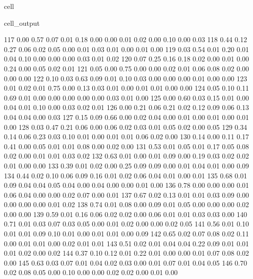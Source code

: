 \documentclass[letterpaper,10pt,english]{jupyterBook}
\begin{document}
\begin{sphinxuseclass}{cell}
\begin{sphinxVerbatimOutput}
\begin{sphinxuseclass}{cell_output}
\begin{sphinxVerbatim}[commandchars=\\\{\}]
       117	0.00 	0.57 	0.07 	0.01 	0.18 	0.00 	0.00 	0.01 	0.02 	0.00 	0.10 	0.00 	0.03
       118	0.44 	0.12 	0.27 	0.06 	0.02 	0.05 	0.00 	0.01 	0.03 	0.01 	0.00 	0.01 	0.00
       119	0.03 	0.54 	0.01 	0.20 	0.01 	0.04 	0.10 	0.00 	0.00 	0.00 	0.03 	0.01 	0.02
       120	0.07 	0.25 	0.16 	0.18 	0.02 	0.00 	0.01 	0.00 	0.24 	0.00 	0.05 	0.02 	0.01
       121	0.05 	0.00 	0.75 	0.00 	0.00 	0.02 	0.01 	0.06 	0.08 	0.02 	0.00 	0.00 	0.00
       122	0.10 	0.03 	0.63 	0.09 	0.01 	0.10 	0.03 	0.00 	0.00 	0.00 	0.01 	0.00 	0.00
       123	0.01 	0.02 	0.01 	0.75 	0.00 	0.13 	0.03 	0.01 	0.00 	0.01 	0.01 	0.00 	0.00
       124	0.05 	0.10 	0.11 	0.69 	0.01 	0.00 	0.00 	0.00 	0.00 	0.00 	0.03 	0.01 	0.00
       125	0.00 	0.60 	0.03 	0.15 	0.01 	0.00 	0.04 	0.01 	0.10 	0.00 	0.03 	0.02 	0.01
       126	0.00 	0.21 	0.06 	0.21 	0.02 	0.12 	0.09 	0.06 	0.13 	0.04 	0.04 	0.00 	0.03
       127	0.15 	0.09 	0.66 	0.00 	0.02 	0.04 	0.00 	0.01 	0.00 	0.01 	0.00 	0.01 	0.00
       128	0.03 	0.47 	0.21 	0.06 	0.00 	0.06 	0.02 	0.03 	0.01 	0.05 	0.02 	0.00 	0.05
       129	0.34 	0.14 	0.06 	0.23 	0.03 	0.10 	0.01 	0.00 	0.01 	0.01 	0.06 	0.02 	0.00
       130	0.14 	0.00 	0.11 	0.17 	0.41 	0.00 	0.05 	0.01 	0.01 	0.08 	0.00 	0.02 	0.00
       131	0.53 	0.01 	0.05 	0.01 	0.17 	0.05 	0.08 	0.02 	0.00 	0.01 	0.01 	0.03 	0.02
       132	0.63 	0.01 	0.00 	0.01 	0.09 	0.00 	0.19 	0.03 	0.02 	0.02 	0.01 	0.00 	0.00
       133	0.39 	0.01 	0.02 	0.00 	0.25 	0.09 	0.09 	0.00 	0.01 	0.04 	0.01 	0.00 	0.09
       134	0.44 	0.02 	0.10 	0.06 	0.09 	0.16 	0.01 	0.02 	0.06 	0.04 	0.01 	0.00 	0.01
       135	0.68 	0.01 	0.09 	0.04 	0.04 	0.05 	0.04 	0.00 	0.04 	0.00 	0.00 	0.01 	0.00
       136	0.78 	0.00 	0.00 	0.00 	0.01 	0.06 	0.04 	0.00 	0.00 	0.02 	0.07 	0.00 	0.01
       137	0.67 	0.02 	0.13 	0.01 	0.01 	0.03 	0.09 	0.00 	0.00 	0.00 	0.00 	0.01 	0.02
       138	0.74 	0.01 	0.08 	0.00 	0.09 	0.01 	0.05 	0.00 	0.00 	0.00 	0.02 	0.00 	0.00
       139	0.59 	0.01 	0.16 	0.06 	0.02 	0.02 	0.00 	0.06 	0.01 	0.01 	0.03 	0.03 	0.00
       140	0.71 	0.01 	0.03 	0.07 	0.03 	0.05 	0.00 	0.01 	0.02 	0.00 	0.00 	0.02 	0.05
       141	0.56 	0.01 	0.10 	0.01 	0.01 	0.09 	0.10 	0.01 	0.00 	0.01 	0.01 	0.00 	0.09
       142	0.65 	0.02 	0.07 	0.08 	0.02 	0.11 	0.00 	0.01 	0.01 	0.00 	0.02 	0.01 	0.01
       143	0.51 	0.02 	0.01 	0.04 	0.04 	0.22 	0.09 	0.01 	0.01 	0.01 	0.02 	0.00 	0.02
       144	0.37 	0.10 	0.12 	0.01 	0.22 	0.01 	0.00 	0.00 	0.01 	0.07 	0.08 	0.02 	0.00
       145	0.63 	0.03 	0.07 	0.01 	0.04 	0.02 	0.03 	0.00 	0.01 	0.07 	0.01 	0.04 	0.05
       146	0.70 	0.02 	0.08 	0.05 	0.00 	0.10 	0.00 	0.00 	0.02 	0.02 	0.00 	0.01 	0.00

\end{sphinxVerbatim}
\end{sphinxuseclass}
\end{sphinxVerbatimOutput}
\end{sphinxuseclass}
\end{document}
